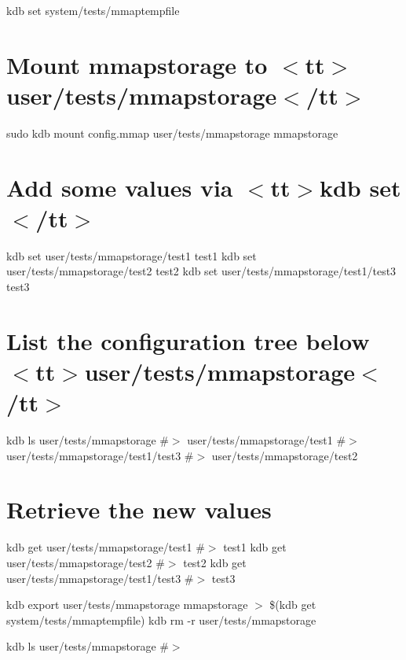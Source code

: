 kdb set system/tests/mmaptempfile \hypertarget{autotoc_md442_autotoc_md455}{}\section{Mount mmapstorage to $<$tt$>$user/tests/mmapstorage$<$/tt$>$}\label{autotoc_md442_autotoc_md455}
sudo kdb mount config.\+mmap user/tests/mmapstorage mmapstorage\hypertarget{autotoc_md442_autotoc_md456}{}\section{Add some values via $<$tt$>$kdb set$<$/tt$>$}\label{autotoc_md442_autotoc_md456}
kdb set user/tests/mmapstorage/test1 test1 kdb set user/tests/mmapstorage/test2 test2 kdb set user/tests/mmapstorage/test1/test3 test3\hypertarget{autotoc_md442_autotoc_md457}{}\section{List the configuration tree below $<$tt$>$user/tests/mmapstorage$<$/tt$>$}\label{autotoc_md442_autotoc_md457}
kdb ls user/tests/mmapstorage \#$>$ user/tests/mmapstorage/test1 \#$>$ user/tests/mmapstorage/test1/test3 \#$>$ user/tests/mmapstorage/test2\hypertarget{autotoc_md442_autotoc_md458}{}\section{Retrieve the new values}\label{autotoc_md442_autotoc_md458}
kdb get user/tests/mmapstorage/test1 \#$>$ test1 kdb get user/tests/mmapstorage/test2 \#$>$ test2 kdb get user/tests/mmapstorage/test1/test3 \#$>$ test3

kdb export user/tests/mmapstorage mmapstorage $>$ \$(kdb get system/tests/mmaptempfile) kdb rm -\/r user/tests/mmapstorage

kdb ls user/tests/mmapstorage \#$>$

